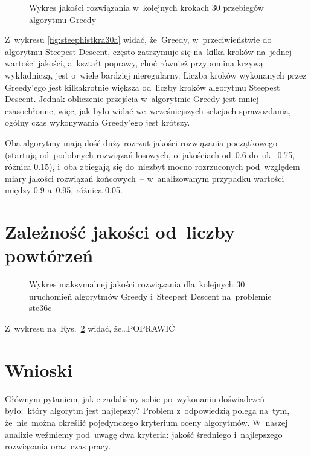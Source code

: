 \documentclass[a4paper,10pt]{article}
\begin{document}
\begin{figure}[!htpb]
\begin{center}

\caption{Wykres jakości rozwiązania w~kolejnych krokach 30 przebiegów algorytmu Greedy}
\label{fig:greedyhistkra30a}
\end{center}
\end{figure}

Z~wykresu \ref{fig:steephistkra30a} widać, że~Greedy, w~przeciwieństwie do algorytmu Steepest Descent, często
zatrzymuje się na~kilka kroków na~jednej wartości jakości, a~kształt poprawy, choć również przypomina krzywą wykładniczą, jest o~wiele
bardziej nieregularny. Liczba kroków wykonanych przez Greedy'ego jest kilkakrotnie większa od~liczby kroków algorytmu Steepest Descent.
Jednak obliczenie przejścia w~algorytmie Greedy jest mniej czasochłonne, więc, jak było widać we~wcześniejszych sekcjach sprawozdania,
ogólny czas wykonywania Greedy'ego jest krótszy.

Oba algorytmy mają dość duży rozrzut jakości rozwiązania początkowego (startują od~podobnych rozwiązań losowych, o~jakościach
od~\num{0.6} do~ok.~\num{0.75}, różnica \num{0.15}), i~oba zbiegają się do~niezbyt mocno rozrzuconych pod~względem miary jakości rozwiązań końcowych~--
w~analizowanym przypadku wartości między \num{0.9} a~\num{0.95}, różnica \num{0.05}.

\section{Zależność jakości od~liczby powtórzeń}
\begin{figure}[!htpb]
\begin{center}

\caption{Wykres maksymalnej jakości rozwiązania dla~kolejnych 30 uruchomień algorytmów Greedy i~Steepest Descent na~problemie ste36c}
\label{fig:qualityrunno}
\end{center}
\end{figure}

Z~wykresu na~Rys.~\ref{fig:qualityrunno} widać, że\ldots POPRAWIĆ

\section{Wnioski}
Głównym pytaniem, jakie zadaliśmy sobie po~wykonaniu doświadczeń było:~który algorytm jest najlepszy?
Problem z~odpowiedzią polega na~tym, że~nie~można określić pojedynczego kryterium oceny algorytmów.
W~naszej analizie weźmiemy pod~uwagę dwa kryteria: jakość średniego i~najlepszego rozwiązania oraz~czas pracy.
\end{document}
